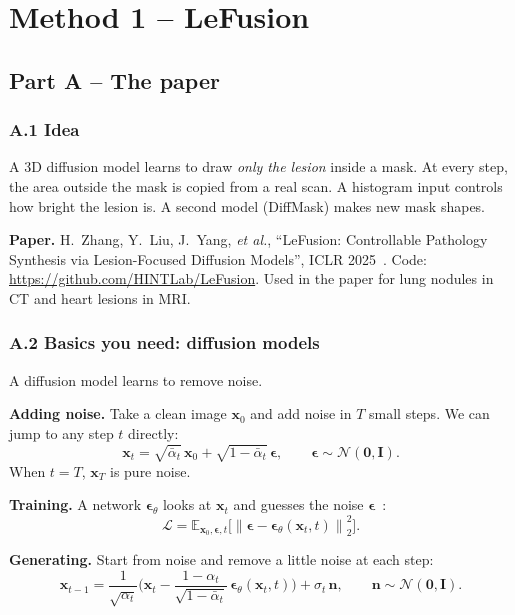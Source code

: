 \documentclass[11pt,a4paper,oneside]{report}
\newcommand{\x}{\bm{x}}
\newcommand{\eps}{\bm{\epsilon}}
\newcommand{\E}{\mathbb{E}}
\newcommand{\N}{\mathcal{N}}
\newcommand{\Loss}{\mathcal{L}}
\newcommand{\abar}{\bar{\alpha}}
\newcommand{\I}{\bm{I}}
\newcommand{\norm}[1]{\left\lVert #1 \right\rVert}
\begin{document}
\chapter{Method 1 -- LeFusion}\label{ch:lefusion}

\section{Part A -- The paper}

\subsection*{A.1 Idea}
\begin{idea}
A 3D diffusion model learns to draw \emph{only the lesion} inside a mask. At every step, the area outside the mask is copied from a real scan. A histogram input controls how bright the lesion is. A second model (DiffMask) makes new mask shapes.
\end{idea}
\textbf{Paper.} H.~Zhang, Y.~Liu, J.~Yang, \emph{et al.}, ``LeFusion: Controllable Pathology Synthesis via Lesion-Focused Diffusion Models'', ICLR 2025~\cite{zhang2025lefusion}. Code: \url{https://github.com/HINTLab/LeFusion}. Used in the paper for lung nodules in CT and heart lesions in MRI.

\subsection*{A.2 Basics you need: diffusion models}
A diffusion model learns to remove noise.

\textbf{Adding noise.} Take a clean image $\x_0$ and add noise in $T$ small steps. We can jump to any step $t$ directly:
\begin{equation}\label{eq:lef-q}
\x_t = \sqrt{\abar_t}\,\x_0 + \sqrt{1-\abar_t}\,\eps,\qquad \eps\sim\N(\bm 0,\I).
\end{equation}
When $t=T$, $\x_T$ is pure noise.

\textbf{Training.} A network $\eps_\theta$ looks at $\x_t$ and guesses the noise $\eps$~\cite{ho2020ddpm}:
\begin{equation}\label{eq:lef-ddpm}
\Loss = \E_{\x_0,\eps,t}\Big[\norm{\eps-\eps_\theta(\x_t,t)}_2^2\Big].
\end{equation}

\textbf{Generating.} Start from noise and remove a little noise at each step:
\begin{equation}\label{eq:lef-rev}
\x_{t-1} = \frac{1}{\sqrt{\alpha_t}}\Big(\x_t - \frac{1-\alpha_t}{\sqrt{1-\abar_t}}\,\eps_\theta(\x_t,t)\Big) + \sigma_t\,\bm n,\qquad \bm n\sim\N(\bm 0,\I).
\end{equation}
\end{document}
